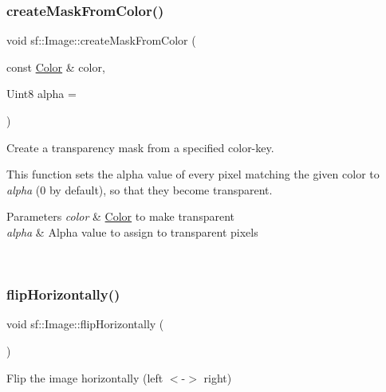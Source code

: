 \subsubsection{\texorpdfstring{createMaskFromColor()}{createMaskFromColor()}}
{\footnotesize\ttfamily void sf\+::\+Image\+::create\+Mask\+From\+Color (\begin{DoxyParamCaption}\item[{const \mbox{\hyperlink{classsf_1_1_color}{Color}} \&}]{color,  }\item[{Uint8}]{alpha = {} }\end{DoxyParamCaption})}



Create a transparency mask from a specified color-\/key. 

This function sets the alpha value of every pixel matching the given color to {\itshape alpha} (0 by default), so that they become transparent.


\begin{DoxyParams}{Parameters}
{\em color} & \mbox{\hyperlink{classsf_1_1_color}{Color}} to make transparent \\
\hline
{\em alpha} & Alpha value to assign to transparent pixels \begin{DoxyVerb}\end{DoxyVerb}
 \\
\hline
\end{DoxyParams}
\mbox{\label{classsf_1_1_image_a57168e7bc29190e08bbd6c9c19f4bb2c}} 
\subsubsection{\texorpdfstring{flipHorizontally()}{flipHorizontally()}}
{\footnotesize\ttfamily void sf\+::\+Image\+::flip\+Horizontally (\begin{DoxyParamCaption}{ }\end{DoxyParamCaption})}



Flip the image horizontally (left $<$-\/$>$ right) 

\begin{DoxyVerb}\end{DoxyVerb}
 \mbox{\label{classsf_1_1_image_a78a702a7e49d1de2dec9894da99d279c}} 
